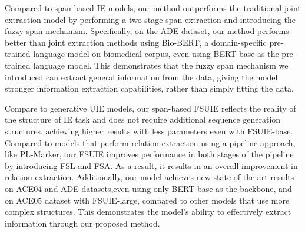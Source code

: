 \documentclass[11pt]{article}
\begin{document}
Compared to span-based IE models, our method outperforms the traditional joint extraction model by performing a two stage span extraction and introducing the fuzzy span mechanism. Specifically, on the ADE dataset, our method performs better than joint extraction methods using Bio-BERT, a domain-specific pre-trained language model on biomedical corpus, even using BERT-base as the pre-trained language model. This demonstrates that the fuzzy span mechanism we introduced can extract general information from the data, giving the model stronger information extraction capabilities, rather than simply fitting the data.



Compare to generative UIE models, our span-based FSUIE reflects the reality of the structure of IE task and does not require additional sequence generation structures, achieving higher results with less parameters even with FSUIE-base.
Compared to models that perform relation extraction using a pipeline approach, like PL-Marker, our FSUIE improves performance in both stages of the pipeline by introducing FSL and FSA. As a result, it results in an overall improvement in relation extraction. Additionally, our model achieves new state-of-the-art results on ACE04 and ADE datasets,even using only BERT-base as the backbone, and on ACE05 dataset with FSUIE-large, compared to other models that use more complex structures. This demonstrates the model's ability to effectively extract information through our proposed method.
\end{document}

